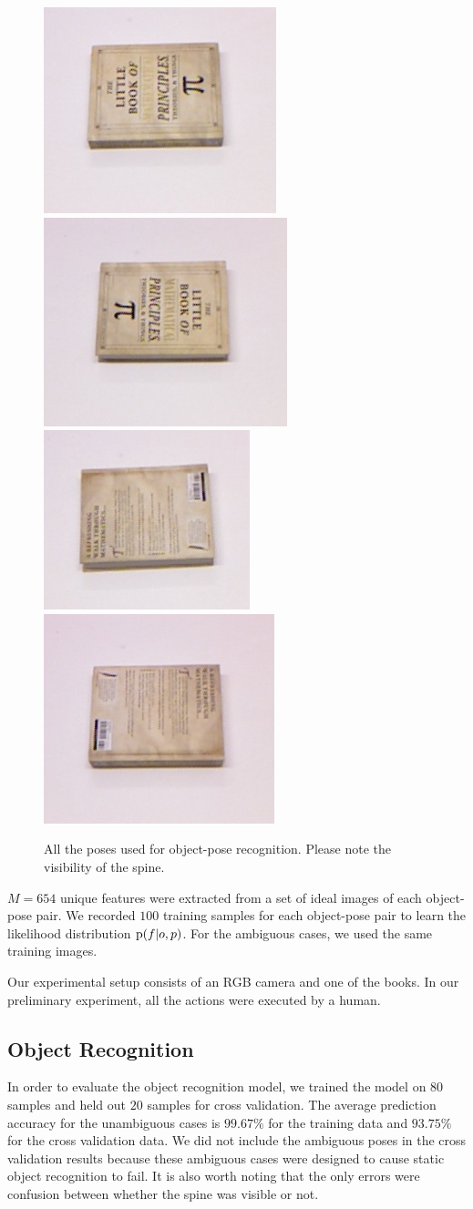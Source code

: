     
     \begin{figure}
     \centering
    		\includegraphics[width = 0.2\columnwidth]{pics/math_cover1.jpg}
    		\includegraphics[width = 0.2\columnwidth]{pics/math_cover1_rot.jpg}
    		\includegraphics[width = 0.2\columnwidth]{pics/math_down.jpg}
    		\includegraphics[width = 0.2\columnwidth]{pics/math_down_rot.jpg}
    		\caption{All the poses used for object-pose recognition. Please note the visibility of the spine.}
	\label{fig:pose_dataset}
    \end{figure}       
    
    
$M = 654$ unique features were extracted from a set of ideal images of each object-pose pair. We recorded $100$ training samples for each object-pose pair to learn the likelihood distribution $\text{p}(f|o,p)$. For the ambiguous cases, we used the same training images.

    Our experimental setup consists of an RGB camera and one of the books. In our preliminary experiment, all the actions were executed by a human.

    \subsection{Object Recognition}
    
	In order to evaluate the object recognition model, we trained the model on $80$ samples and held out $20$ samples for cross validation. The average prediction accuracy for the unambiguous cases is $99.67\%$ for the training data and $93.75\%$ for the cross validation data. We did not include the ambiguous poses in the cross validation results because these ambiguous cases were designed to cause static object recognition to fail. It is also worth noting that the only errors were confusion between whether the spine was visible or not.
    
